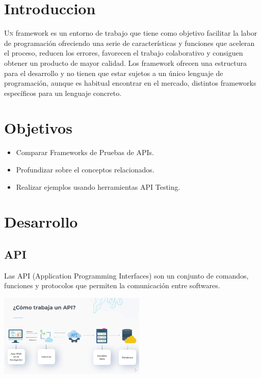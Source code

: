 \documentclass[twoside,twocolumn]{article}
\begin{document}
\maketitle
\section{Introduccion}

\lettrine[nindent=0em,lines=3]{U}n framework es un entorno de trabajo que tiene como objetivo facilitar la labor de programación ofreciendo una serie de características y funciones que aceleran el proceso, reducen los errores, favorecen el trabajo colaborativo y consiguen obtener un producto de mayor calidad.
Los framework ofrecen una estructura para el desarrollo y no tienen que estar sujetos a un único lenguaje de programación, aunque es habitual encontrar en el mercado, distintos frameworks específicos para un lenguaje concreto.

\section{Objetivos}

\begin{itemize}
\item Comparar Frameworks de Pruebas de APIs.
\item Profundizar sobre el conceptos relacionados.
\item Realizar ejemplos usando herramientas API Testing.
\end{itemize}
\section{Desarrollo}
\subsection{API}
Las API (Application Programming Interfaces) son un conjunto de comandos, funciones y protocolos que permiten la comunicación entre softwares.
\begin{center}
	\includegraphics[width=7cm]{./imagenes/api.png} 
	\end{center}
\end{document}
